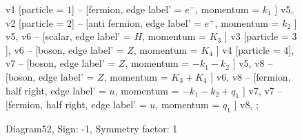 \documentclass{revtex4}
\begin{document}
\begin{figure}[!htb]
\begin{center}
{    %
v1 [particle = \(1\)] -- [fermion, edge label' = \(e^{-}\), momentum = \(k_{1}\) ] v5, 
v2 [particle = \(2\)] -- [anti fermion, edge label' = \(e^{+}\), momentum = \(k_{2}\) ] v5, 
v6 -- [scalar, edge label' = \(H\), momentum = \(K_{3}\) ] v3 [particle = \(3\)], 
v6 -- [boson, edge label' = \(Z\), momentum = \(K_{4}\) ] v4 [particle = \(4\)], 
v7 -- [boson, edge label' = \(Z\), momentum = \(-k_{1} - k_{2}\) ] v5, 
v8 -- [boson, edge label' = \(Z\), momentum = \(K_{3} + K_{4}\) ] v6, 
v8 -- [fermion, half right, edge label' = \(u\), momentum = \(-k_{1} - k_{2} + q_{1}\) ] v7, 
v7 -- [fermion, half right, edge label' = \(u\), momentum = \(q_{1}\) ] v8, 
};
\end{center}
\caption{Diagram52, Sign: -1, Symmetry factor: 1}
\end{figure}
\newpage
\end{document}
